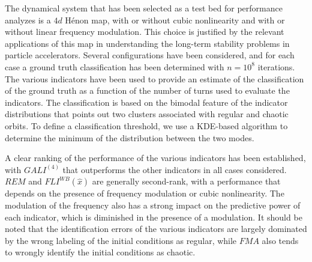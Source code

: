 The dynamical system that has been selected as a test bed for performance analyzes is a $4d$ H\'enon map, with or without cubic nonlinearity and with or without linear frequency modulation. This choice is justified by the relevant applications of this map in understanding the long-term stability problems in particle accelerators. Several configurations have been considered, and for each case a ground truth classification has been determined with $n=10^8$ iterations. The various indicators have been used to provide an estimate of the classification of the ground truth as a function of the number of turns used to evaluate the indicators. The classification is based on the bimodal feature of the indicator distributions that points out two clusters associated with regular and chaotic orbits. To define a classification threshold, we use a KDE-based algorithm to determine the minimum of the distribution between the two modes.

A clear ranking of the performance of the various indicators has been established, with $GALI^{(4)}$ that outperforms the other indicators in all cases considered. $REM$ and $FLI^{{WB}}(\hat{x})$ are generally second-rank, with a performance that depends on the presence of frequency modulation or cubic nonlinearity. The modulation of the frequency also has a strong impact on the predictive power of each indicator, which is diminished in the presence of a modulation. It should be noted that the identification errors of the various indicators are largely dominated by the wrong labeling of the initial conditions as regular, while $FMA$ also tends to wrongly identify the initial conditions as chaotic. 

